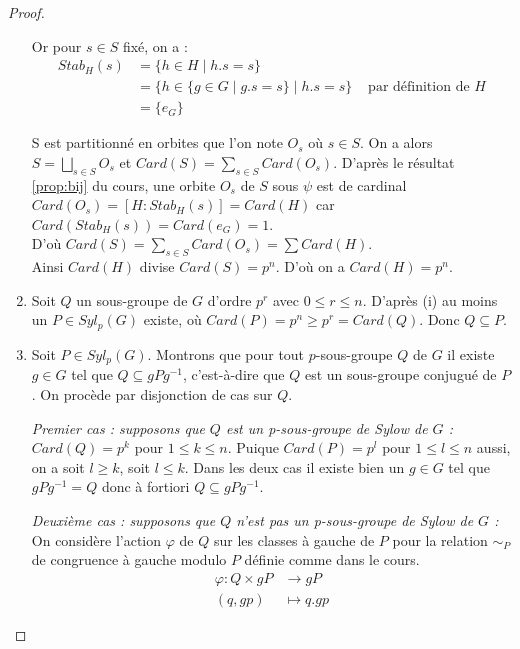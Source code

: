 \documentclass{article}
\theoremstyle{definition}
\theoremstyle{plain}
\theoremstyle{plain}
\theoremstyle{plain}
\theoremstyle{plain}
\theoremstyle{definition}
\theoremstyle{plain}
\theoremstyle{plain}
\begin{document}
\begin{proof}
\begin{enumerate}[label={\upshape(\roman*)}]
Or pour \( s \in S \) fixé, on a :
\begin{align*}
	Stab_{H}({s}) &= \{ h \in H \mid h.s = s \} \\ 
		      &= \{ h \in \{g \in G \mid g.s = s \} \mid h.s = s \} &\text{ par définition de } H\\
	&= \{e_{G}\} 
\end{align*}

S est partitionné en orbites que l'on note \( O_s \) où \( s \in S \). On a alors \( S = \bigsqcup_{s \in S} O_{s} \) et \( Card(S) = \sum_{s \in S} Card(O_{s}) \).
D'après le résultat \ref{prop:bij} du cours, une orbite \( O_s \) de \( S \) sous \( \psi \) est de cardinal \( Card(O_s) = [H : Stab_{H}({s}) ] = Card(H) \) car \( Card(Stab_{H}({s})) = Card(e_{G}) = 1 \). \\
D'où \( Card(S) = \sum_{s \in S} Card(O_{s}) = \sum Card(H) \).\\ 
Ainsi \( Card(H) \) divise \( Card(S) = p^{n} \). D'où on a \( Card(H) = p^{n} \).

\item Soit \( Q \) un sous-groupe de \( G \) d'ordre \( p^{r} \) avec \( 0 \leq r \leq n \). 
D'après (i) au moins un \( P \in Syl_p(G) \) existe, où \( Card(P) = p^{n} \geq p ^{r} = Card(Q) \).
Donc \( Q \subseteq P \).

\item Soit \( P \in Syl_{p}({G}) \). Montrons que pour tout \(p\)-sous-groupe \( Q \) de \( G \) il existe \( g \in G \) tel que \( Q \subseteq gPg^{-1} \), c'est-à-dire que \( Q \) est un sous-groupe conjugué de \( P \). On procède par disjonction de cas sur \( Q \).
	\par \textit{Premier cas : supposons que \( Q \) est un p-sous-groupe de Sylow de \( G \) :}\\
	\( Card(Q) = p^{k}\) pour \( 1 \le k \le n \). Puique \( Card(P) = p^{l}\) pour 
	\( 1 \le l \le n \) aussi, on a soit \( l \ge k \), soit \( l \le k \). Dans les 
	deux cas il existe bien un \( g \in G \) tel que 
	\( gPg^{-1} = Q \) donc à fortiori \( Q \subseteq gPg^{-1} \).
	
	\par \textit{Deuxième cas : supposons que \( Q \) n'est pas un p-sous-groupe de Sylow de \( G \) :}\\ On considère l'action \( \varphi \) de \( Q \) sur les classes à gauche de \( P \) pour la relation \( \sim_{P} \) de congruence à gauche modulo \( P \) définie comme dans le cours. 
\begin{align*}
	\varphi : Q \times gP &\to gP \\
	(q,gp) &\mapsto q.gp
\end{align*}


\end{enumerate}
\end{proof}
\end{document}

